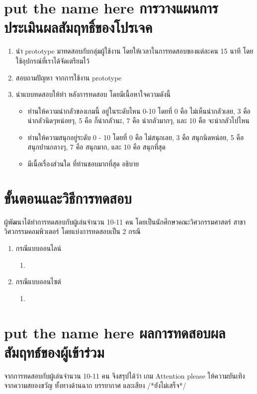 \section{\ifenglish put the name here \else การวางแผนการประเมินผลสัมฤทธิ์ของโปรเจค\fi}
\begin{enumerate}
    \item นำ prototype มาทดสอบกับกลุ่มผู้ใช้งาน โดยให้เวลาในการทดสอบของแต่ละคน 15 นาที โดยใช้อุปกรณ์ที่เราได้จัดเตรียมไว้
    \item สอบถามปัญหา จากการใช้งาน prototype
    \item นำแบบทดสอบให้ทำ หลังการทดสอบ โดยมีเนื้อหาใจความดังนี้
    \begin{itemize}
        \item ท่านให้ความน่ากลัวของเกมนี้ อยู่ในระดับไหน 0-10 โดยที่ 0 คือ ไม่เห็นน่ากลัวเลย, 3 คือ น่ากลัวนิดๆหน่อยๆ, 5 คือ ก็น่ากลัวนะ, 7 คือ น่ากลัวมากๆ, และ 10 คือ จะน่ากลัวไปไหน
        \item ท่านให้ความสนุกอยู่ระดับ 0 - 10 โดยที่ 0 คือ ไม่สนุกเลย, 3 คือ สนุกนิดหน่อย, 5 คือ สนุกปานกลางๆ, 7 คือ สนุกมาก, และ 10 คือ สนุกที่สุด
        \item มีเนื้อเรื่องส่วนใด ที่ท่านชอบมากที่สุด อธิบาย
    \end{itemize}
\end{enumerate}

\section{ขั้นตอนและวิธีการทดสอบ}
ผู้พัฒนาได้ทำการทดสอบกับผู้เล่นจำนวน 10-11 คน โดยเป็นนักศึกษาคณะวิศวกรรมศาสตร์ สาขาวิศวกรรมคอมพิวเตอร์ โดยแบ่งการทดสอบเป็น 2 กรณี
\begin{enumerate}
    \item กรณีแบบออนไลน์
    \begin{enumerate}
        \item 
    \end{enumerate}
    \item กรณีแบบออนไซต์
    \begin{enumerate}
        \item 
    \end{enumerate}
\end{enumerate}

\section{\ifenglish put the name here \else ผลการทดสอบผลสัมฤทธ์ของผู้เข้าร่วม\fi}
จากการทดสอบกับผู้เล่นจำนวน 10-11 คน จึงสรุปได้ว่า เกม Attention please ให้ความบันเทิงจากความสยองขวัญ ทั้งทางด้านฉาก บรรยากาศ และเสียง
/*ยังไม่เสร็จ*/

